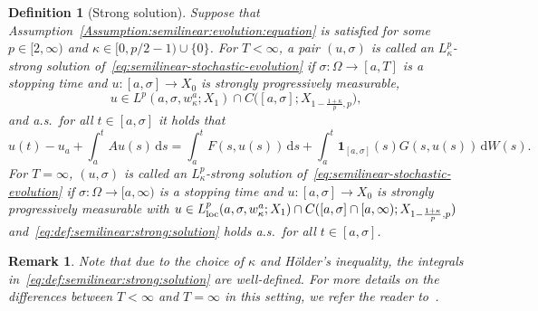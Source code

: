 \documentclass[reqno]{amsart}
\newtheorem{definition}[Satz]{Definition}
\newtheorem{remark}[Satz]{Remark}
\newcommand{\1}{\mathbf{1}}
\newcommand{\loc}{\textup{loc}}
\newcommand{\dd}{\ensuremath{\mathrm{d}}}
\begin{document}
\begin{definition}[Strong solution]
    Suppose that Assumption~\ref{Assumption:semilinear:evolution:equation} is satisfied for some $p\in[2,\infty)$ and $\kappa\in [0,p/2-1)\cup\{0\}$. For $T<\infty$, a pair $(u,\sigma)$ is called an $L^p_\kappa$-strong solution of~\eqref{eq:semilinear-stochastic-evolution} if $\sigma\colon\Omega\to[a,T]$ is a stopping time and $u\colon [a,\sigma]\to X_0$  is strongly progressively measurable, 
    \begin{equation*} u\in L^p(a,\sigma, w_\kappa^a;X_1)\cap C\big([a,\sigma];X_{1-\frac{1+\kappa}{p},p}\big),
    \end{equation*}
    and a.s.\ for all $t\in [a,\sigma]$ it holds that 
    \begin{equation}\label{eq:def:semilinear:strong:solution}
        u(t)-u_a +\int_a^t Au(s)\,\dd s = \int_a^t F(s,u(s))\, \dd s +\int_a^t\1_{[a,\sigma]}(s) G(s,u(s))\, \dd W(s).
    \end{equation}
    For $T=\infty$, $(u,\sigma)$ is called an $L^p_\kappa$-strong solution of~\eqref{eq:semilinear-stochastic-evolution} if $\sigma\colon\Omega\to [a,\infty)$ is a stopping time and $u\colon[a,\sigma]\to X_0$ is strongly progressively measurable with $u\in L^p_{\loc}(a,\sigma,w_\kappa^a;X_1)\cap C([a,\sigma]\cap[a,\infty);X_{1-\frac{1+\kappa}{p},p})$ and~\eqref{eq:def:semilinear:strong:solution} holds a.s.\ for all $t\in [a,\sigma]$. 
\end{definition}
\begin{remark}
    Note that due to the choice of $\kappa$ and Hölder's inequality, the integrals in~\eqref{eq:def:semilinear:strong:solution} are well-defined. 
    For more details on the differences between $T<\infty$ and $T=\infty$ in this setting, we refer the reader to~\cite[Section 4.3]{agrestiNonlinearParabolicStochastic2022a}.
\end{remark}
\end{document}
